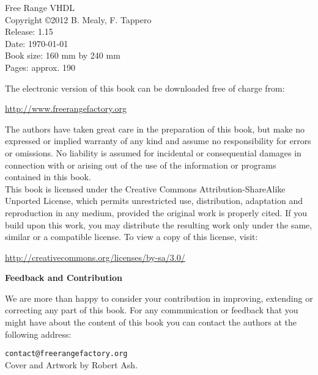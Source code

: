 %
%
\setcounter{page}{1}

{\footnotesize
\noindent
Free Range VHDL\\
Copyright \copyright 2012 B. Mealy, F. Tappero\\
Release: 1.15\\
Date: \today\\
Book size: 160 mm by 240 mm\\
Pages: approx. 190\\
\vspace{20pt}

\noindent
The electronic version of this book can be downloaded free of charge from:

\noindent
\url{http://www.freerangefactory.org}

\vspace{15pt}

\noindent
The authors have taken great care in the preparation of this book, but make no expressed or implied warranty of any kind and assume no responsibility for errors or omissions. No liability is assumed for incidental or consequential damages in connection with or arising out of the use of the information or programs contained in this book.\\

\noindent
This book is licensed under the Creative Commons Attribution-ShareAlike Unported License, which permits unrestricted use, distribution, adaptation and reproduction in any medium, provided the original work is properly cited. If you build upon this work, you may distribute the resulting work only under the same, similar or a compatible license. To view a copy of this license, visit:

\noindent
\url{http://creativecommons.org/licenses/by-sa/3.0/}
\vspace{25pt}

\noindent
{\sffamily\bfseries Feedback and Contribution}

\noindent
We are more than happy to consider your contribution in improving, extending or correcting any part of this book.
For any communication or feedback that you might have about the content of this book you can contact the authors at the following address:

\noindent
\texttt{contact@freerangefactory.org}\\

\vfill
\noindent
Cover and Artwork by Robert Ash.

} %
